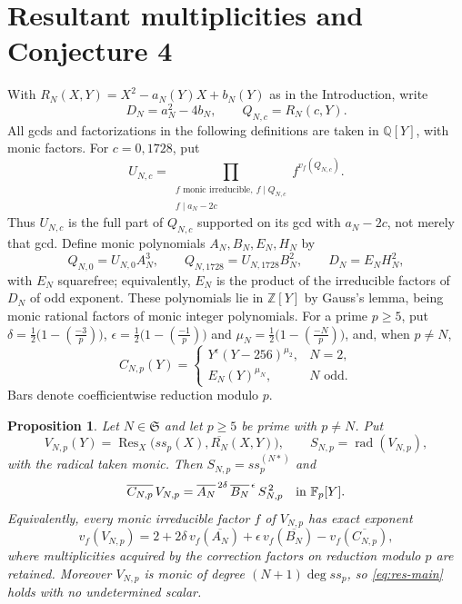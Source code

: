 \documentclass[11pt,a4paper]{article}
\newtheorem{proposition}[theorem]{Proposition}
\theoremstyle{remark}\newtheorem{remark}[theorem]{Remark}
\numberwithin{equation}{section}
\newcommand{\Q}{\mathbb Q}\newcommand{\Z}{\mathbb Z}
\newcommand{\leg}[2]{\left(\frac{#1}{#2}\right)}
\begin{document}
	\section{Resultant multiplicities and Conjecture 4}\label{sec:resultant}
	With $R_N(X,Y)=X^2-a_N(Y)X+b_N(Y)$ as in the Introduction, write
	\[
	D_N=a_N^2-4b_N,\qquad Q_{N,c}=R_N(c,Y).
	\]
	All gcds and factorizations in the following definitions are taken in $\Q[Y]$, with monic factors. For $c=0,1728$, put
	\begin{equation}\label{eq:res-U}
		U_{N,c}=\prod_{\substack{f\text{ monic irreducible},\ f\mid Q_{N,c}\\ f\mid a_N-2c}} f^{v_f(Q_{N,c})}.
	\end{equation}
	Thus $U_{N,c}$ is the full part of $Q_{N,c}$ supported on its gcd with $a_N-2c$, not merely that gcd. Define monic polynomials $A_N,B_N,E_N,H_N$ by
	\begin{equation}\label{eq:res-ABE}
		Q_{N,0}=U_{N,0}A_N^3,\qquad Q_{N,1728}=U_{N,1728}B_N^2,\qquad D_N=E_NH_N^2,
	\end{equation}
	with $E_N$ squarefree; equivalently, $E_N$ is the product of the irreducible factors of $D_N$ of odd exponent. These polynomials lie in $\Z[Y]$ by Gauss's lemma, being monic rational factors of monic integer polynomials. For a prime $p\geq5$, put $\delta=\tfrac12\bigl(1-\leg{-3}{p}\bigr)$, $\epsilon=\tfrac12\bigl(1-\leg{-1}{p}\bigr)$ and $\mu_N=\tfrac12\bigl(1-\leg{-N}{p}\bigr)$, and, when $p\neq N$,
	\begin{equation}\label{eq:res-C}
		C_{N,p}(Y)=\begin{cases}
			Y^{\epsilon}(Y-256)^{\mu_2},&N=2,\\
			E_N(Y)^{\mu_N},&N\text{ odd}.
		\end{cases}
	\end{equation}
	Bars denote coefficientwise reduction modulo $p$.
	
	\begin{proposition}\label{prop:resultant}
		Let $N\in\mathfrak S$ and let $p\geq5$ be prime with $p\neq N$. Put
		\[
		V_{N,p}(Y)=\operatorname{Res}_X\bigl(ss_p(X),\overline{R_N}(X,Y)\bigr),\qquad S_{N,p}=\operatorname{rad}(V_{N,p}),
		\]
		with the radical taken monic. Then $S_{N,p}=ss_p^{(N*)}$ and
		\begin{equation}\label{eq:res-main}
			\overline{C_{N,p}}\,V_{N,p}=\overline{A_N}^{\,2\delta}\,\overline{B_N}^{\,\epsilon}\,S_{N,p}^{\,2}\quad\text{in }\mathbb F_p[Y].
		\end{equation}
		Equivalently, every monic irreducible factor $f$ of $V_{N,p}$ has exact exponent
		\begin{equation}\label{eq:res-exponent}
			v_f(V_{N,p})=2+2\delta\,v_f(\overline{A_N})+\epsilon\,v_f(\overline{B_N})-v_f(\overline{C_{N,p}}),
		\end{equation}
		where multiplicities acquired by the correction factors on reduction modulo $p$ are retained. Moreover $V_{N,p}$ is monic of degree $(N+1)\deg ss_p$, so \eqref{eq:res-main} holds with no undetermined scalar.
	\end{proposition}
	
\end{document}
